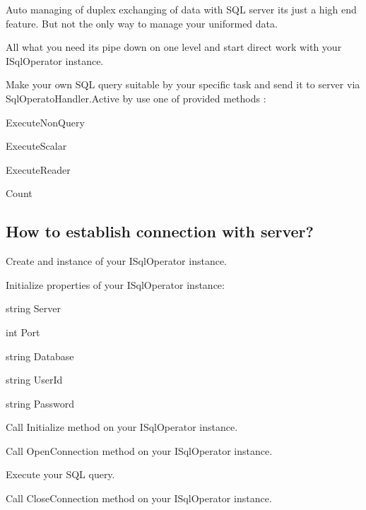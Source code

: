Auto managing of duplex exchanging of data with S\+QL server it\textquotesingle{}s just a high end feature. But not the only way to manage your uniformed data.

All what you need it\textquotesingle{}s pipe down on one level and start direct work with your {\ttfamily I\+Sql\+Operator} instance.

Make your own S\+QL query suitable by your specific task and send it to server via {\ttfamily Sql\+Operato\+Handler.\+Active} by use one of provided methods \+:
\begin{DoxyItemize}
\item {\ttfamily Execute\+Non\+Query}
\item {\ttfamily Execute\+Scalar}
\item {\ttfamily Execute\+Reader}
\item {\ttfamily Count}
\end{DoxyItemize}

\subsection*{How to establish connection with server?}


\begin{DoxyEnumerate}
\item Create and instance of your {\ttfamily I\+Sql\+Operator} instance.
\item Initialize properties of your {\ttfamily I\+Sql\+Operator} instance\+:
\begin{DoxyItemize}
\item {\ttfamily string Server}
\item {\ttfamily int Port}
\item {\ttfamily string Database}
\item {\ttfamily string User\+Id}
\item {\ttfamily string Password}
\end{DoxyItemize}
\item Call {\ttfamily Initialize} method on your {\ttfamily I\+Sql\+Operator} instance.
\item Call {\ttfamily Open\+Connection} method on your {\ttfamily I\+Sql\+Operator} instance.
\item Execute your S\+QL query.
\item Call {\ttfamily Close\+Connection} method on your {\ttfamily I\+Sql\+Operator} instance. 
\end{DoxyEnumerate}